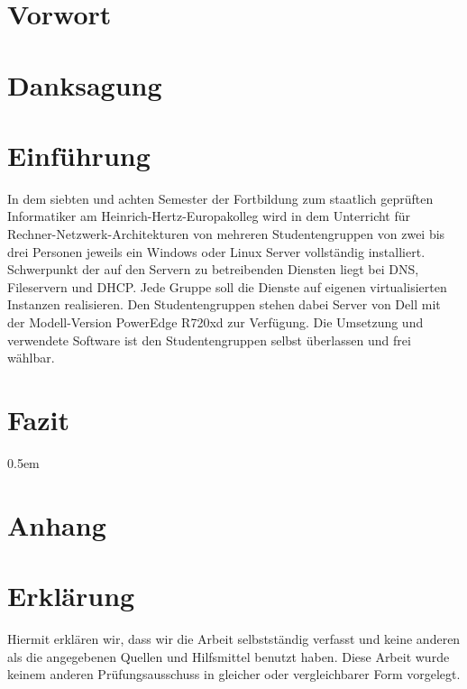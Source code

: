 \chapter*{Vorwort}

\chapter*{Danksagung}

\newpage

\tableofcontents
\listoffigures
\begingroup
\let\clearpage\relax
\lstlistoflistings{}
\listoftables
\endgroup

\chapter{Einführung}
\label{chap:einfuehrung}
In dem siebten und achten Semester der Fortbildung zum staatlich geprüften
Informatiker am Heinrich\hyp{}Hertz\hyp{}Europakolleg wird in dem Unterricht
für Rechner\hyp{}Netzwerk\hyp{}Architekturen von mehreren Studentengruppen von
zwei bis drei Personen jeweils ein Windows oder Linux Server vollständig
installiert. Schwerpunkt der auf den Servern zu betreibenden Diensten liegt bei
DNS, Fileservern und DHCP. Jede Gruppe soll die Dienste auf eigenen
virtualisierten Instanzen realisieren. Den Studentengruppen stehen dabei Server
von Dell mit der Modell-Version PowerEdge R720xd zur Verfügung. Die Umsetzung
und verwendete Software ist den Studentengruppen selbst überlassen und frei
wählbar.

\chapter{Fazit}


\printglossaries%

\begingroup
{}
\emergencystretch0.5em
\printbibliography[heading=bibnumbered]
\endgroup

\chapter{Anhang}


\FloatBarrier%

\FloatBarrier%


\chapter{Erklärung}
Hiermit erklären wir, dass wir die Arbeit selbstständig verfasst und keine
anderen als die angegebenen Quellen und Hilfsmittel benutzt haben. Diese Arbeit
wurde keinem anderen Prüfungsausschuss in gleicher oder vergleichbarer Form
vorgelegt.

